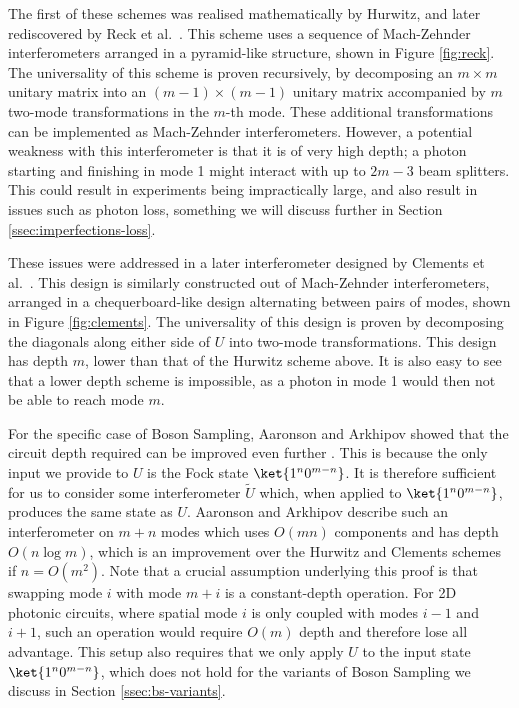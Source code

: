 The first of these schemes was realised mathematically by Hurwitz, and later rediscovered by Reck et al.~\cite{hurwitz1897, reck1994}. This scheme uses a sequence of Mach-Zehnder interferometers arranged in a pyramid-like structure, shown in Figure \ref{fig:reck}. The universality of this scheme is proven recursively, by decomposing an $m\times m$ unitary matrix into an $(m-1)\times(m-1)$ unitary matrix accompanied by $m$ two-mode transformations in the $m$-th mode. These additional transformations can be implemented as Mach-Zehnder interferometers. However, a potential weakness with this interferometer is that it is of very high depth; a photon starting and finishing in mode 1 might interact with up to $2m-3$ beam splitters. This could result in experiments being impractically large, and also result in issues such as photon loss, something we will discuss further in Section \ref{ssec:imperfections-loss}.

These issues were addressed in a later interferometer designed by Clements et al.~\cite{clements2016}. This design is similarly constructed out of Mach-Zehnder interferometers, arranged in a chequerboard-like design alternating between pairs of modes, shown in Figure \ref{fig:clements}. The universality of this design is proven by decomposing the diagonals along either side of $U$ into two-mode transformations. This design has depth $m$, lower than that of the Hurwitz scheme above. It is also easy to see that a lower depth scheme is impossible, as a photon in mode 1 would then not be able to reach mode $m$.

For the specific case of Boson Sampling, Aaronson and Arkhipov showed that the circuit depth required can be improved even further \cite{aaronson2011, aaronson2010report}. This is because the only input we provide to $U$ is the Fock state $\ket{1^n0^{m-n}}$. It is therefore sufficient for us to consider some interferometer $\tilde{U}$ which, when applied to $\ket{1^n0^{m-n}}$, produces the same state as $U$. Aaronson and Arkhipov describe such an interferometer on $m+n$ modes which uses $O(mn)$ components and has depth $O(n\log m)$, which is an improvement over the Hurwitz and Clements schemes if $n=O(m^2)$. Note that a crucial assumption underlying this proof is that swapping mode $i$ with mode $m+i$ is a constant-depth operation. For 2D photonic circuits, where spatial mode $i$ is only coupled with modes $i-1$ and $i+1$, such an operation would require $O(m)$ depth and therefore lose all advantage. This setup also requires that we only apply $U$ to the input state $\ket{1^n0^{m-n}}$, which does not hold for the variants of Boson Sampling we discuss in Section \ref{ssec:bs-variants}.


